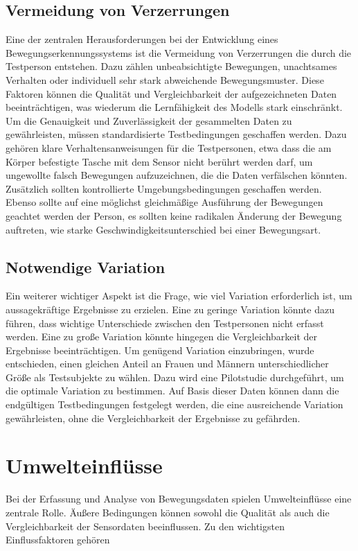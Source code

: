 \subsection{Vermeidung von Verzerrungen}
Eine der zentralen Herausforderungen bei der Entwicklung eines Bewegungserkennungssystems ist die Vermeidung von Verzerrungen die durch die Testperson entstehen. Dazu zählen unbeabsichtigte Bewegungen, unachtsames Verhalten oder individuell sehr stark abweichende Bewegungsmuster. Diese Faktoren können die Qualität und Vergleichbarkeit der aufgezeichneten Daten beeinträchtigen, was wiederum die Lernfähigkeit des Modells stark einschränkt.\newline
Um die Genauigkeit und Zuverlässigkeit der gesammelten Daten zu gewährleisten, müssen standardisierte Testbedingungen geschaffen werden. Dazu gehören klare Verhaltensanweisungen für die Testpersonen, etwa dass die am Körper befestigte Tasche mit dem Sensor nicht berührt werden darf, um ungewollte falsch Bewegungen aufzuzeichnen, die die Daten verfälschen könnten. Zusätzlich sollten kontrollierte Umgebungsbedingungen geschaffen werden. Ebenso sollte auf eine möglichst gleichmäßige Ausführung der Bewegungen geachtet werden der Person, es sollten keine radikalen Änderung der Bewegung auftreten, wie starke Geschwindigkeitsunterschied bei einer Bewegungsart.

\subsection{Notwendige Variation}
Ein weiterer wichtiger Aspekt ist die Frage, wie viel Variation erforderlich ist, um aussagekräftige Ergebnisse zu erzielen. Eine zu geringe Variation könnte dazu führen, dass wichtige Unterschiede zwischen den Testpersonen nicht erfasst werden. Eine zu große Variation könnte hingegen die Vergleichbarkeit der Ergebnisse beeinträchtigen. Um genügend Variation einzubringen, wurde entschieden, einen gleichen Anteil an Frauen und Männern unterschiedlicher Größe als Testsubjekte zu wählen. Dazu wird eine Pilotstudie durchgeführt, um die optimale Variation zu bestimmen. Auf Basis dieser Daten können dann die endgültigen Testbedingungen festgelegt werden, die eine ausreichende Variation gewährleisten, ohne die Vergleichbarkeit der Ergebnisse zu gefährden.

\section{Umwelteinflüsse}
\label{sec:umwelt}
Bei der Erfassung und Analyse von Bewegungsdaten spielen Umwelteinflüsse eine zentrale Rolle. Äußere Bedingungen können sowohl die Qualität als auch die Vergleichbarkeit der Sensordaten beeinflussen. Zu den wichtigsten Einflussfaktoren gehören

